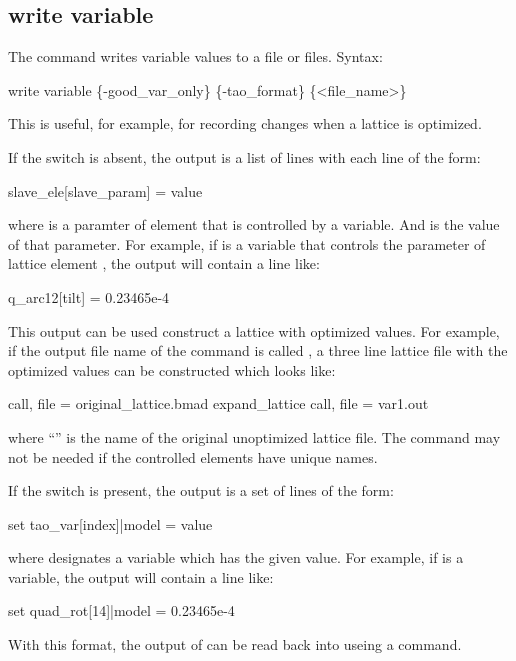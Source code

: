 {{{{{{{{{%

\subsection{write variable}
\label{s:write.variable}

The  command writes \tao variable values to a file or files.
Syntax:
\begin{example}
    write variable \{-good_var_only\} \{-tao_format\} \{<file_name>\} 
\end{example}
This is useful, for example, for recording changes when a lattice is optimized.

If the  switch is absent, the output is a list of lines with each line of the form:
\begin{example}
  slave_ele[slave_param] = value
\end{example}
where  is a paramter of \bmad element  that is controlled by a \tao
variable. And  is the value of that parameter. For example, if  is a \tao
variable that controls the  parameter of \bmad lattice element , the output
will contain a line like:
\begin{example}
  q_arc12[tilt] = 0.23465e-4
\end{example}
This output can be used construct a lattice with optimized values. For example, if the output file
name of the  command is called , a three line lattice file with the
optimized values can be constructed which looks like:
\begin{example}
  call, file = original_lattice.bmad
  expand_lattice
  call, file = var1.out
\end{example}
where ``'' is the name of the original unoptimized lattice file. The
 command may not be needed if the controlled \bmad elements have unique names.

If the  switch is present, the output is a set of lines of the form:
\begin{example}
  set tao_var[index]|model = value
\end{example}
where  designates a \tao variable which has the given  value. For
example, if  is a \tao variable, the output
will contain a line like:
\begin{example}
  set quad_rot[14]|model = 0.23465e-4
\end{example}
With this format, the output of  can be read back into \tao useing a 
command.

}}}}}}}}}
